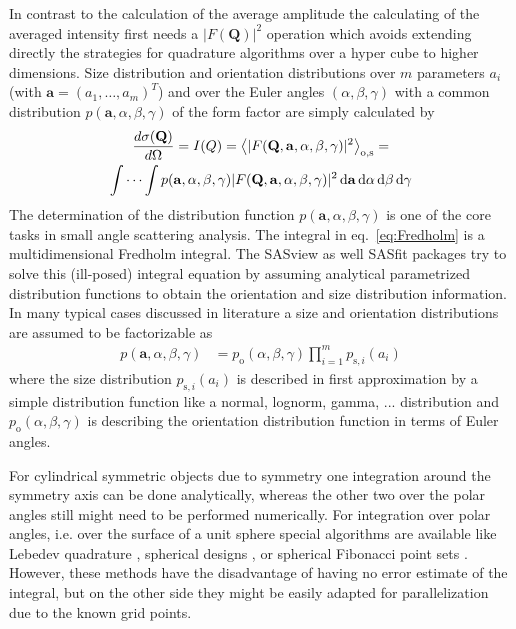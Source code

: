 In contrast to the calculation of the average amplitude the calculating of the averaged intensity first needs a $\vert F(\mathbf{Q})\vert^2$ operation which avoids extending directly the strategies  for quadrature algorithms over a hyper cube to higher dimensions.
Size distribution and orientation distributions over $m$ parameters $a_i$ (with $\mathbf{a}=(a_1, \ldots, a_m)^T$) and over the Euler angles  $(\alpha,\beta,\gamma)$ with a common distribution $p(\mathbf{a},\alpha,\beta,\gamma)$ of the form factor are simply calculated by
\begin{multline} \label{eq:Fredholm}
 \frac{d\sigma(\mathbf{Q})}{d\Omega} = I(Q) = \left\langle \vert F(\mathbf{Q},\mathbf{a},\alpha,\beta,\gamma)\vert^2\right\rangle_{\mathrm{o},\mathrm{s}} = \\
 \idotsint  p(\mathbf{a},\alpha,\beta,\gamma) \vert F(\mathbf{Q},\mathbf{a},\alpha,\beta,\gamma)\vert^2 \, \mathrm{d}\mathbf{a} \, \mathrm{d}\alpha \, \mathrm{d}\beta \, \mathrm{d}\gamma
\end{multline}
The determination of the distribution function $p(\mathbf{a},\alpha,\beta,\gamma)$ is one of the core tasks in small angle scattering analysis. The integral in eq.\ \ref{eq:Fredholm} is a multidimensional Fredholm integral. The SASview as well SASfit packages try to solve this (ill-posed) integral equation by assuming analytical parametrized distribution functions to obtain the orientation and size distribution information. In many typical cases discussed in literature a size and  orientation distributions are assumed to be factorizable as
\begin{align}
p(\mathbf{a},\alpha,\beta,\gamma) &= p_\mathrm{o}(\alpha,\beta,\gamma)\prod_{i=1}^m p_{\mathrm{s},i}(a_i)
\end{align}
where the size distribution $p_{\mathrm{s},i}(a_i)$ is described in first approximation by a simple distribution function like a normal, lognorm, gamma, ... distribution and $p_\mathrm{o}(\alpha,\beta,\gamma)$ is describing the orientation distribution function in terms of Euler angles.


For cylindrical symmetric objects due to symmetry one integration around the symmetry axis can be done analytically, whereas the other two over the polar angles still might need to be performed numerically.
For integration over polar angles, i.e. over the surface of a unit sphere special algorithms are available like Lebedev quadrature \cite{Lebedev1975,Lebedev1976,Lebedev1977,Lebedev2003}, spherical designs \cite{Graef2011,Hardin1996}, or spherical Fibonacci point sets \cite{Marques_2013,Swinbank2006}. However, these methods have the disadvantage of having no error estimate of the integral, but on the other side they might be easily adapted for parallelization due to the known grid points.

